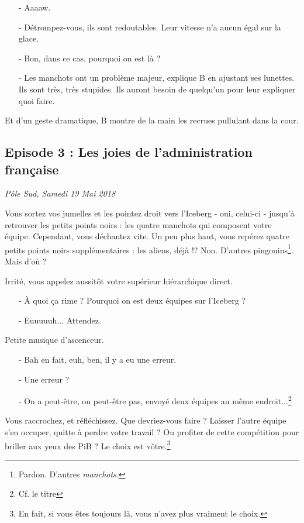 \begin{itemize}
    \item[-] Aaaaw.
    \item[-] Détrompez-vous, ils sont redoutables. Leur vitesse n'a aucun égal
        sur la glace.
    \item[-] Bon, dans ce cas, pourquoi on est là ?
    \item[-] Les manchots ont un problème majeur, explique B en ajustant ses
        lunettes. Ils sont très, très stupides. Ils auront besoin de quelqu'un
        pour leur expliquer quoi faire.
\end{itemize}

Et d'un geste dramatique, B montre de la main les recrues pullulant dans la
cour.

\subsection{Episode 3 : Les joies de l'administration française}
\hfill \textit{Pôle Sud, Samedi 19 Mai 2018}

Vous sortez vos jumelles et les pointez droit vers l'Iceberg - oui, celui-ci -
jusqu'à retrouver les petits points noirs : les quatre manchots qui composent
votre équipe.
Cependant, vous déchantez vite. Un peu plus haut, vous repérez quatre petits
points noirs supplémentaires : les aliens, déjà !? Non. D'autres
pingouins\footnote{Pardon. D'autres \emph{manchots}.}. Mais d'où ?

Irrité, vous appelez aussitôt votre supérieur hiérarchique direct.

\begin{itemize}
    \item[-] À quoi ça rime ? Pourquoi on est deux équipes sur l'Iceberg ?
    \item[-] Euuuuuh... Attendez.
\end{itemize}

Petite musique d'ascenceur.

\begin{itemize}
    \item[-] Bah en fait, euh, ben, il y a eu une erreur.
    \item[-] Une erreur ?
    \item[-] On a peut-être, ou peut-être pas, envoyé deux équipes au même
        endroit...\footnote{Cf. le titre}
\end{itemize}

Vous raccrochez, et réfléchissez. Que devriez-vous faire ? Laisser l'autre
équipe s'en occuper, quitte à perdre votre travail ? Ou profiter de cette
compétition pour briller aux yeux des PiB ? Le choix est vôtre.\footnote{En
fait, si vous êtes toujours là, vous n'avez plus vraiment le choix.}
